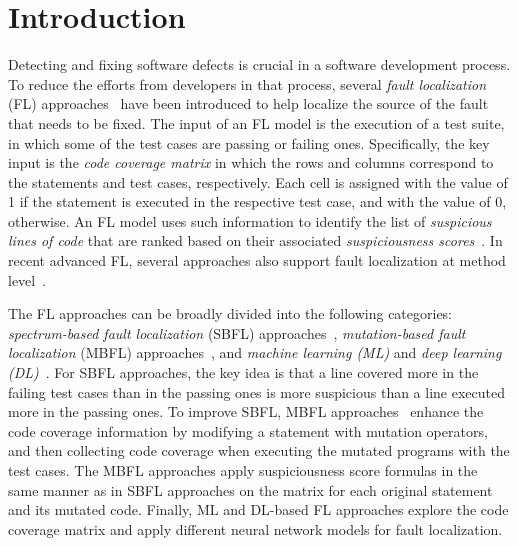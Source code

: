 \section{Introduction}

Detecting and fixing software defects is crucial in a software
development process.
To reduce the efforts from developers in that
process, several {\em fault localization} (FL)
approaches~\cite{fl-survey} have been introduced to help localize the
source of the fault that needs to be fixed. The input of an FL model
is the execution of a test suite, in which some of the test cases are
passing or failing ones. Specifically, the key input is the {\em code
  coverage matrix} in which the rows and columns correspond to the
statements and test cases, respectively.  Each cell is assigned with
the value of 1 if the statement is executed in the
respective test case, and with the value of 0, otherwise.  An FL model
uses such information to identify the list of {\em suspicious lines of
  code} that are ranked based on their associated {\em suspiciousness
  scores}~\cite{fl-survey}. In recent advanced FL, several approaches
also support fault localization at method
level~\cite{DeepFL,icse21-fl}.




The FL approaches can be broadly divided into the following
categories: {\em spectrum-based fault localization} (SBFL)
approaches~\cite{Ochiai,jones2001visualization,keller2017critical},
{\em mutation-based fault localization} (MBFL)
approaches~\cite{MUSE,papadakis2012using,Metallaxis}, and {\em machine
  learning (ML)} and {\em deep learning (DL)}~\cite{DeepFL,icse21-fl}.
For SBFL approaches, the key idea is that a line covered more in the
failing test cases than in the passing ones is more suspicious than a
line executed more in the passing ones.
%
To improve SBFL, MBFL
approaches~\cite{MUSE,papadakis2012using,Metallaxis} enhance the code
coverage information by modifying a statement with mutation operators,
and then collecting code coverage when executing the mutated programs
with the test cases. The MBFL approaches apply suspiciousness score
formulas in the same manner as in SBFL approaches on the matrix for
each original statement and its mutated code.
%
Finally, ML and DL-based FL approaches explore the code coverage
matrix and apply different neural network models for fault
localization.


